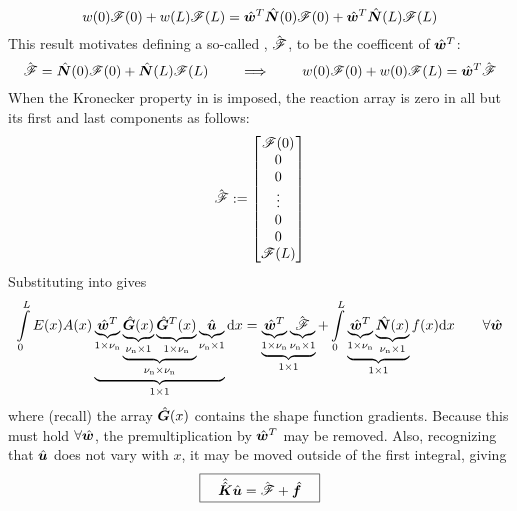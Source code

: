 \begin{equation}
w(0)\mathscr{F}(0)+w(L)\mathscr{F}(L)
=\hat{\bm{w}}^T\hat{\bm{N}}(0)\mathscr{F}(0)
+\hat{\bm{w}}^T\hat{\bm{N}}(L)\mathscr{F}(L)
\end{equation}
This result motivates defining a so-called , $\hat{\bm{\mathscr{F}}}$, to be the coefficent of $\hat{\bm{w}}^T$:
\begin{equation}
  \hat{\bm{\mathscr{F}}}=\hat{\bm{N}}(0)\mathscr{F}(0) +\hat{\bm{N}}(L)\mathscr{F}(L)
\qquad\implies\qquad
w(0)\mathscr{F}(0)+w(0)\mathscr{F}(L)=\hat{\bm{w}}^T\hat{\bm{\mathscr{F}}}
\label{eq:ReactionArray}
\end{equation} 
When the Kronecker property in  is imposed, the reaction array is zero in all but its first and last components as follows:
\begin{equation}
  \hat{\bm{\mathscr{F}}}:=
\begin{bmatrix}
\mathscr{F}(0) \\
0 \\
0 \\
\vdots\\
0 \\
0 \\
\mathscr{F}(L)
\end{bmatrix}
\end{equation}
Substituting  into  gives
\begin{equation}
 \int\limits_0^L E(x)A(x) 
\underbrace{
	\underbrace{
           \hat{\bm{w}}^T
   }_{1\times{\nu_\text{n}}}
	\underbrace{
	      \underbrace{
              \hat{\bm{G}}(x)
          }_{{\nu_\text{n}}\times1}
	     \underbrace{
            \hat{\bm{G}}^T(x)
          }_{1\times{\nu_\text{n}}}
	}_{{\nu_\text{n}}\times{\nu_\text{n}}}
	\underbrace{\hat{\bm{u}}}_{{\nu_\text{n}}\times1}
}_{1\times1} 
\mathrm{d} x 
= 
\underbrace{\underbrace{\hat{\bm{w}}^T}_{1\times{\nu_\text{n}}}\underbrace{\hat{\bm{\mathscr{F}}}}_{{\nu_\text{n}}\times1}}_{1\times1}
+  \int\limits_0^L \underbrace{\underbrace{\hat{\bm{w}}^T}_{1\times{\nu_\text{n}}}\underbrace{\hat{\bm{N}}(x)}_{{\nu_\text{n}}\times1}}_{1\times1}f(x)
\mathrm{d} x
 \qquad\forall\hat{\bm{w}}
\label{eq:LinearBarWeakFormWithForces}
\end{equation}
where (recall) the array $\hat{\bm{G}}(x)$ contains the shape function gradients.
Because this must hold $\forall\hat{\bm{w}}$, the premultiplication by $\hat{\bm{w}}^T$ may be removed. Also, recognizing that $\hat{\bm{u}}$ does not vary with $x$, it may be moved outside of the first integral, giving
\begin{equation}
\boxed{\quad
\hat{\hat{\bm{K}}}\hat{\bm{u}}
=
\hat{\bm{\mathscr{F}}}  
+  \hat{\bm{f}}
\quad}
\label{eq:LinearBarWeakFormDiscr}
\end{equation}
